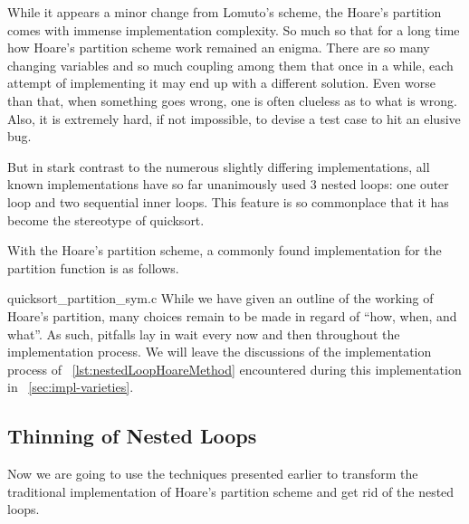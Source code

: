 While it appears a minor change from Lomuto's scheme, the Hoare's partition comes with immense
implementation complexity.
So much so that for a long time how Hoare's partition scheme work
remained an enigma\cite{Bentley-Beautiful-code}.
There are so many changing variables and so much coupling among them that once in a
while, each attempt of implementing it may end up with a different solution.
Even worse than that, when something goes wrong, one is often clueless as to what is wrong.
Also, it is extremely hard, if not impossible, to devise a test case to hit an elusive bug.


But in stark contrast to the numerous slightly differing implementations, all known implementations
have so far unanimously used $3$ nested loops: one outer loop and two sequential inner loops.
This feature is so commonplace that it has become the stereotype of quicksort.





With the Hoare's partition scheme, a commonly found implementation for the partition function is as
follows.

{quicksort_partition_sym.c}
While we have given an outline of the working of Hoare's partition, many choices remain to be
made in regard of ``how, when, and what''.
As such, pitfalls lay in wait every now and then throughout the implementation process.
We will leave the discussions of the implementation process of ~\autoref{lst:nestedLoopHoareMethod}
encountered during this implementation in ~\autoref{sec:impl-varieties}.


\subsection{Thinning of Nested Loops}\label{subsec:unwind-hoare-part}

Now we are going to use the techniques presented earlier to transform the traditional
implementation of Hoare's partition scheme and get rid of the nested loops.


